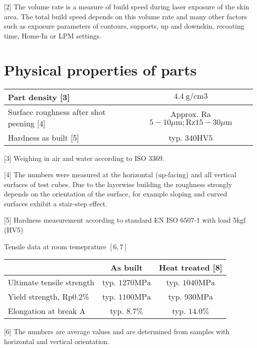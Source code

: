 \documentclass[10pt]{article}
\begin{document}
[2] The volume rate is a measure of build speed during laser exposure of the skin area. The total build speed depends on this volume rate and many other factors such as exposure parameters of contours, supports, up and downskin, recoating time, Home-In or LPM settings.

\section*{Physical properties of parts}
\begin{center}
\begin{tabular}{lc}
\hline
Part density [3] & $4.4 \mathrm{~g} / \mathrm{cm} 3$ \\
\hline
Surface roughness after shot peening [4] & Approx. Ra $5-10 \mu \mathrm{m} ; \mathrm{Rz} 15-30 \mu \mathrm{m}$ \\
\hline
Hardness as built [5] & typ. $340 \mathrm{HV} 5$ \\
\hline
\end{tabular}
\end{center}

[3] Weighing in air and water according to ISO 3369.

[4] The numbers were measured at the horizontal (up-facing) and all vertical surfaces of test cubes. Due to the layerwise building the roughness strongly depends on the orientation of the surface, for example sloping and curved surfaces exhibit a stair-step effect.

[5] Hardness measurement according to standard EN ISO 6507-1 with load 5kgf (HV5)

Tensile data at room temeprature $[6,7]$

\begin{center}
\begin{tabular}{lcc}
\hline
 & As built & Heat treated [8] \\
\hline
Ultimate tensile strength & typ. $1270 \mathrm{MPa}$ & typ. $1040 \mathrm{MPa}$ \\
\hline
Yield strength, Rp0.2\% & typ. $1100 \mathrm{MPa}$ & typ. $930 \mathrm{MPa}$ \\
\hline
Elongation at break A & typ. $8.7 \%$ & typ. $14.0 \%$ \\
\hline
\end{tabular}
\end{center}

[6] The numbers are average values and are determined from samples with horizontal and vertical orientation.
\end{document}
